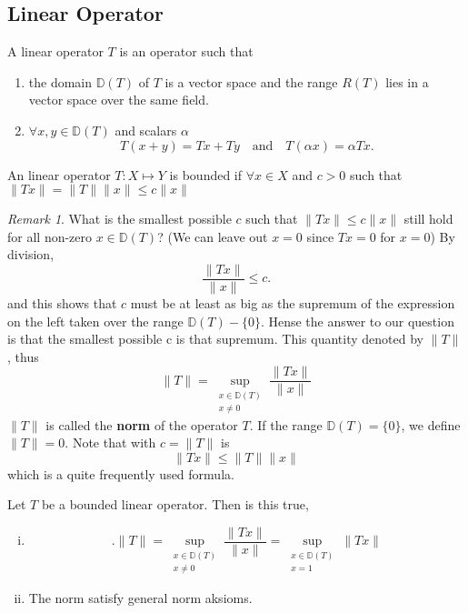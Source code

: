 \documentclass{article}
\theoremstyle{remark}
\newtheorem*{remark}{Remark}
\begin{document}
\subsection{Linear Operator}%
\label{sub:linear_operator}

\begin{definition}
  A linear operator $T$ is an operator such that 
  \begin{enumerate}
    \item the domain $\mathbb{D}\left( T \right) $ of $T$ is a vector space and the range $R\left( T \right) $ lies in a vector space over the same field. 
    \item  $\forall x,y \in \mathbb{D}\left( T \right) $ and scalars $\alpha$ 
      \begin{equation}
      \label{eq:linear-operator}
      T\left( x + y \right) = Tx + Ty \quad \text{and} \quad T\left( \alpha x \right) = \alpha Tx
      .\end{equation}
  \end{enumerate}

\end{definition}

\begin{definition}
  An linear operator $T: X \mapsto Y$ is bounded if $\forall x \in X$ and $c > 0$ such that $\|Tx\|= \|T\|\|x\| \le c \|x\|$
\end{definition}
\begin{remark}
  What is the smallest possible $c$ such that $\|Tx\| \le c \|x\|$ still hold for all non-zero $x \in \mathbb{D}\left( T \right) $? (We can leave out $x=0$ since $Tx=0$ for $x=0$) By division, \[
  \frac{\|Tx\|}{\|x\|} \le c.
\] and this shows that  $c$ must be at least as big as the supremum of the expression on the left taken over the range $\mathbb{D}\left( T \right) - \{0\} $. Hense the answer to our question is that the smallest possible c is that supremum. This quantity denoted by $\|T\|$, thus \[
\|T\| = \sup_{\substack{ x \in \mathbb{D}\left( T \right) \\ x \neq 0}}  \frac{\|Tx\|}{\|x\|}
\] 
$\|T\|$ is called the \textbf{norm} of the operator $T$. If the range $\mathbb{D}\left( T \right) = \{0\} $, we define $\|T\| = 0$. Note that with $c = \|T\|$ is \[
\|Tx\| \le  \|T\| \|x\| 
\] which is a quite frequently used formula. 

\end{remark}

\begin{lemma}
  Let $T$ be a bounded linear operator. Then is this true,
  \begin{enumerate}[(i)]
    \item 
\[
.
        \|T\| = \sup_{\substack{x \in \mathbb{D}\left( T \right) \\ x \neq 0 } }  \frac{\|Tx\|}{\|x\|}= \sup_{\substack{x \in \mathbb{D}\left( T \right) \\ x = 1 } } \|Tx\| 
\] 
    \item The norm satisfy general norm aksioms.
  \end{enumerate}
\end{lemma}
\end{document}

